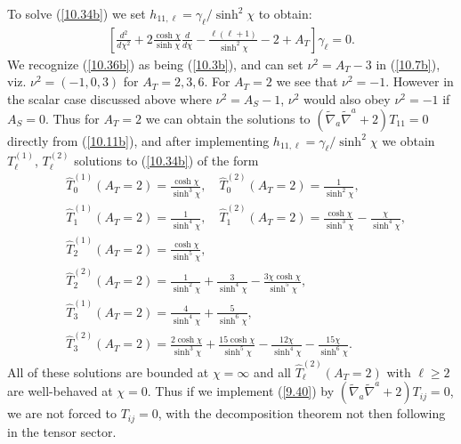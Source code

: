 To solve (\ref{10.34b}) we set $h_{11,\ell}=\gamma_{\ell}/\sinh^2\chi$ to obtain:
%
\begin{eqnarray}
\left[\frac{d^2}{d\chi^2}+2\frac{\cosh\chi}{\sinh\chi}\frac{d}{d\chi}
-\frac{\ell(\ell+1) }{ \sinh^2\chi}-2+A_T\right]\gamma_{\ell}=0.
\label{10.36b}
\end{eqnarray}
%
We recognize (\ref{10.36b}) as being (\ref{10.3b}), and can set $\nu^2=A_T-3$ in (\ref{10.7b}), viz. $\nu^2=(-1,0,3)$ for $A_T=2,3,6$. For $A_T=2$ we see that $\nu^2=-1$. However in the scalar case discussed above where $\nu^2=A_S-1$, $\nu^2$ would also obey $\nu^2=-1$ if $A_S=0$. Thus for $A_T=2$ we can obtain the solutions to $(\tilde{\nabla}_a\tilde{\nabla}^a+2)T_{11}=0$ directly from (\ref{10.11b}), and after implementing $h_{11,\ell}=\gamma_{\ell}/\sinh^2\chi$ we obtain $T^{(1)}_{\ell}$, $T^{(2)}_{\ell}$ solutions to (\ref{10.34b}) of the form 
%
\begin{align}
&\hat{T}^{(1)}_{0}(A_T=2)=\frac{\cosh\chi}{\sinh^3\chi},\quad \hat{T}^{(2)}_{0}(A_T=2)=\frac{1}{\sinh^2\chi},
\nonumber\\
&\hat{T}^{(1)}_{1}(A_T=2)=\frac{1}{\sinh^4\chi},\quad \hat{T}^{(2)}_{1}(A_T=2)=\frac{\cosh\chi}{\sinh^3\chi}-\frac{\chi}{\sinh^4\chi},
\nonumber\\
&\hat{T}^{(1)}_{2}(A_T=2)=\frac{\cosh\chi}{\sinh^5\chi},
\nonumber\\
& \hat{T}^{(2)}_{2}(A_T=2)=\frac{1}{\sinh^2\chi}+\frac{3}{\sinh^4\chi}-\frac{3\chi\cosh\chi}{\sinh^5\chi},
\nonumber\\
&\hat{T}^{(1)}_{3}(A_T=2)=\frac{4}{\sinh^4\chi}+\frac{5}{\sinh^6\chi},
\nonumber\\
&\hat{T}^{(2)}_{3}(A_T=2)=
\frac{2\cosh\chi}{\sinh^3\chi}+\frac{15\cosh\chi}{\sinh^5\chi}-\frac{12\chi}{\sinh^4\chi}-\frac{15\chi}{\sinh^6\chi}.
\label{10.37b}
\end{align}
%
All of these solutions are bounded at $\chi=\infty$ and all $\hat{T}^{(2)}_{\ell}(A_T=2)$ with $\ell\geq 2$ are well-behaved at $\chi=0$.  Thus if we implement (\ref{9.40}) by $(\tilde{\nabla}_a\tilde{\nabla}^a+2)T_{ij}=0$,  we are not forced to $T_{ij}=0$, with the decomposition theorem not then following in the tensor sector.

